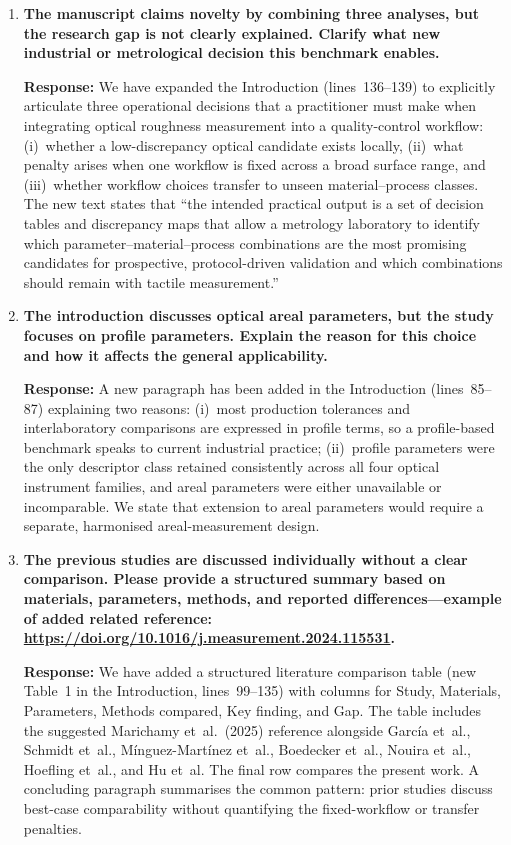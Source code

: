\documentclass[10pt]{article}
\begin{document}
\begin{enumerate}[leftmargin=*, label=\textbf{Comment \arabic*.}, ref=\arabic*]

\item \textbf{The manuscript claims novelty by combining three analyses, but the research gap is not clearly explained. Clarify what new industrial or metrological decision this benchmark enables.}

\textbf{Response:} We have expanded the Introduction (lines~136--139) to explicitly articulate three operational decisions that a practitioner must make when integrating optical roughness measurement into a quality-control workflow: (i)~whether a low-discrepancy optical candidate exists locally, (ii)~what penalty arises when one workflow is fixed across a broad surface range, and (iii)~whether workflow choices transfer to unseen material--process classes. The new text states that ``the intended practical output is a set of decision tables and discrepancy maps that allow a metrology laboratory to identify which parameter--material--process combinations are the most promising candidates for prospective, protocol-driven validation and which combinations should remain with tactile measurement.''

\item \textbf{The introduction discusses optical areal parameters, but the study focuses on profile parameters. Explain the reason for this choice and how it affects the general applicability.}

\textbf{Response:} A new paragraph has been added in the Introduction (lines~85--87) explaining two reasons: (i)~most production tolerances and interlaboratory comparisons are expressed in profile terms, so a profile-based benchmark speaks to current industrial practice; (ii)~profile parameters were the only descriptor class retained consistently across all four optical instrument families, and areal parameters were either unavailable or incomparable. We state that extension to areal parameters would require a separate, harmonised areal-measurement design.

\item \textbf{The previous studies are discussed individually without a clear comparison. Please provide a structured summary based on materials, parameters, methods, and reported differences---example of added related reference: \url{https://doi.org/10.1016/j.measurement.2024.115531}.}

\textbf{Response:} We have added a structured literature comparison table (new Table~1 in the Introduction, lines~99--135) with columns for Study, Materials, Parameters, Methods compared, Key finding, and Gap. The table includes the suggested Marichamy et~al.\ (2025) reference alongside Garc\'ia et~al., Schmidt et~al., M\'inguez-Mart\'inez et~al., Boedecker et~al., Nouira et~al., Hoefling et~al., and Hu et~al. The final row compares the present work. A concluding paragraph summarises the common pattern: prior studies discuss best-case comparability without quantifying the fixed-workflow or transfer penalties.


\end{enumerate}
\end{document}
